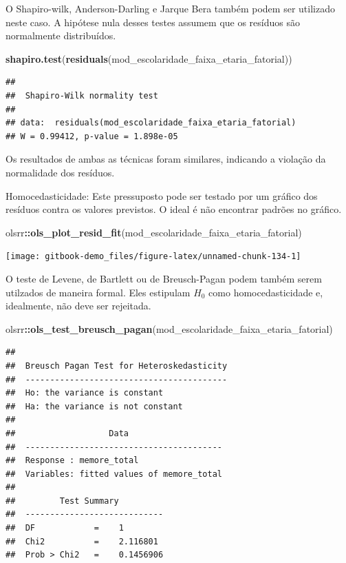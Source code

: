 \documentclass[
]{book}
\newenvironment{Shaded}{\begin{snugshade}}{\end{snugshade}}
\newcommand{\KeywordTok}[1]{\textcolor[rgb]{0.13,0.29,0.53}{\textbf{#1}}}
\newcommand{\NormalTok}[1]{#1}
\newcommand{\OperatorTok}[1]{\textcolor[rgb]{0.81,0.36,0.00}{\textbf{#1}}}
\begin{document}
O Shapiro-wilk, Anderson-Darling e Jarque Bera também podem ser utilizado neste caso. A hipótese nula desses testes assumem que os resíduos são normalmente distribuídos.

\begin{Shaded}
\begin{Highlighting}[]
\KeywordTok{shapiro.test}\NormalTok{(}\KeywordTok{residuals}\NormalTok{(mod_escolaridade_faixa_etaria_fatorial))}
\end{Highlighting}
\end{Shaded}

\begin{verbatim}
## 
##  Shapiro-Wilk normality test
## 
## data:  residuals(mod_escolaridade_faixa_etaria_fatorial)
## W = 0.99412, p-value = 1.898e-05
\end{verbatim}

Os resultados de ambas as técnicas foram similares, indicando a violação da normalidade dos resíduos.

Homocedasticidade: Este pressuposto pode ser testado por um gráfico dos resíduos contra os valores previstos. O ideal é não encontrar padrões no gráfico.

\begin{Shaded}
\begin{Highlighting}[]
\NormalTok{olsrr}\OperatorTok{::}\KeywordTok{ols_plot_resid_fit}\NormalTok{(mod_escolaridade_faixa_etaria_fatorial)}
\end{Highlighting}
\end{Shaded}

\begin{center}\texttt{[image: gitbook-demo\_files/figure-latex/unnamed-chunk-134-1]} \end{center}

O teste de Levene, de Bartlett ou de Breusch-Pagan podem também serem utilzados de maneira formal. Eles estipulam \(H_0\) como homocedasticidade e, idealmente, não deve ser rejeitada.

\begin{Shaded}
\begin{Highlighting}[]
\NormalTok{olsrr}\OperatorTok{::}\KeywordTok{ols_test_breusch_pagan}\NormalTok{(mod_escolaridade_faixa_etaria_fatorial)}
\end{Highlighting}
\end{Shaded}

\begin{verbatim}
## 
##  Breusch Pagan Test for Heteroskedasticity
##  -----------------------------------------
##  Ho: the variance is constant            
##  Ha: the variance is not constant        
## 
##                   Data                   
##  ----------------------------------------
##  Response : memore_total 
##  Variables: fitted values of memore_total 
## 
##         Test Summary         
##  ----------------------------
##  DF            =    1 
##  Chi2          =    2.116801 
##  Prob > Chi2   =    0.1456906
\end{verbatim}
\end{document}

